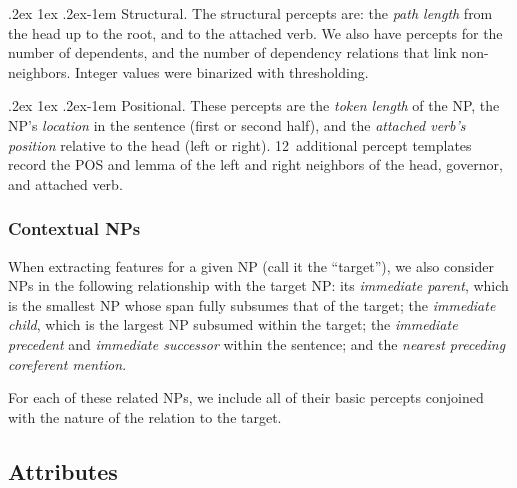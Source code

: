 \documentclass[11pt,letterpaper]{article}
\makeatletter
\renewcommand{\paragraph}{%
  \@startsection{paragraph}{4}%
  {\z@}{.2ex \@plus 1ex \@minus .2ex}{-1em}%
  {\normalfont\normalsize\bfseries}%
}
\makeatother
\begin{document}
\paragraph{Structural.} 
The structural percepts are: the \emph{path length} from the head up to the root, and to the attached verb. 
We also have percepts for the number of dependents, and the number of dependency relations that link non-neighbors.
Integer values were binarized with thresholding.

\paragraph{Positional.} 
These percepts are the \emph{token length} of the NP, the NP's \emph{location} in the sentence (first or second half), and 
the \emph{attached verb's position} relative to the head (left or right). 
12~additional percept templates record the POS and lemma of the left and right neighbors of the head, governor, and attached verb.

\subsubsection{Contextual NPs}

When extracting features for a given NP (call it the ``target''), 
we also consider NPs in the following relationship with the target NP:
its \emph{immediate parent}, which is the smallest NP whose span fully subsumes that of the target; 
the \emph{immediate child}, which is the largest NP subsumed within the target;
the \emph{immediate precedent} and \emph{immediate successor} within the sentence; 
and the \emph{nearest preceding coreferent mention}.

For each of these related NPs, we include all of their basic percepts 
conjoined with the nature of the relation to the target.

\subsection{Attributes}\label{sec:attrs}
\end{document}

